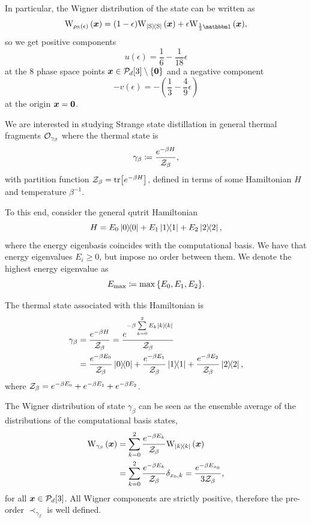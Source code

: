 \documentclass[pra,
aps,
twocolumn,
superscriptaddress,
groupedaddress,
nofootinbib,
reprint
]{revtex4-1}
\begin{document}
In particular, the Wigner distribution of the state can be written as 
\begin{equation}
	\W[\bmx]{\rho_{\rm{S}}(\epsilon)} = (1-\epsilon)\W[\bmx]{\ketbra{\rm{S}}} + \epsilon\W[\bmx]{\frac{1}{3}\id},
\end{equation}
so we get positive components
\begin{equation}
	u(\epsilon) = \frac{1}{6} -\frac{1}{18}\epsilon
\end{equation}
at the 8 phase space points $\bm{x} \in \mathcal{P}_d[3] \setminus \{\bm{0}\}$ and a negative component
\begin{equation}
	- v(\epsilon) = - \left( \frac{1}{3} -\frac{4}{9}\epsilon \right)
\end{equation}
at the origin $\bm{x} = \bm{0}$.

We are interested in studying Strange state distillation in general thermal fragments $\mathcal{O}_{\gamma_\beta}$ where the thermal state is
\begin{equation}
	\gamma_\beta \coloneqq \frac{e^{-\beta H}}{\mathcal{Z}_\beta},
\end{equation}
with partition function $\mathcal{Z}_\beta = {\rm{tr}} \big[e^{-\beta H} \big]$, defined in terms of some Hamiltonian $H$ and temperature $\beta^{-1}$.

To this end, consider the general qutrit Hamiltonian
\begin{equation}
	H = E_0 \ketbra{0} + E_1 \ketbra{1} + E_2 \ketbra{2},
\end{equation}
where the energy eigenbasis coincides with the computational basis.
We have that energy eigenvalues $E_i \geq 0$, but impose no order between them.
We denote the highest energy eigenvalue as
\begin{equation}
	E_{\rm{max}} \coloneqq \max{\{E_0, E_1, E_2\}}.
\end{equation}

The thermal state associated with this Hamiltonian is
\begin{align}
	\gamma_\beta &= \frac{e^{-\beta H}}{\mathcal{Z}_\beta} = \frac{e^{-\beta \sum\limits_{k=0}^2 E_k \ketbra{k}}}{\mathcal{Z}_\beta} \\
	&= \frac{e^{-\beta E_0}}{\mathcal{Z}_\beta}\ketbra{0} + \frac{e^{-\beta E_1}}{\mathcal{Z}_\beta}\ketbra{1} + \frac{e^{-\beta E_2}}{\mathcal{Z}_\beta}\ketbra{2},
\end{align}
where $\mathcal{Z}_\beta = e^{-\beta E_0} + e^{-\beta E_1} + e^{-\beta E_2}$.

The Wigner distribution of state $\gamma_\beta$ can be seen as the ensemble average of the distributions of the computational basis states,
\begin{align}
	\W[\bmx]{\gamma_\beta} &= \sum\limits_{k=0}^2 \frac{e^{-\beta E_k}}{\Z_\beta}\W[\bmx]{\ketbra{k}} \\
	&= \sum\limits_{k=0}^2 \frac{e^{-\beta E_k}}{\Z_\beta} \delta_{x_0, k} = \frac{e^{-\beta E_{x_0}}}{3\Z_\beta},
\end{align}
for all $\bm{x} \in \mathcal{P}_d[3]$. 
All Wigner components are strictly positive, therefore the pre-order $\prec_{\gamma_\beta}$ is well defined.
\end{document}
